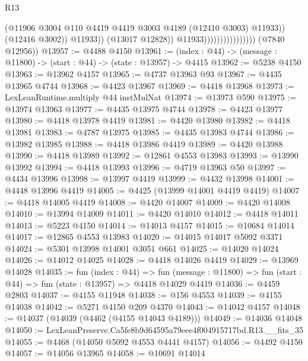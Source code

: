 \begin{lexlean}{R13}
\begin{coremodule}
                                                (@11906
                                                  @3004
                                                  @110
                                                  @4419
                                                  @4419
                                                  @3003
                                                  @4189
                                                  (@12410 @3003)
                                                  @11933))
                                              (@12416 @3002))
                                            @11933))
                                        (@13017 @12828))
                                      @11933))))))))))))))))
      (@7840 @12956))
@13957 := @4488 @4150
@13961 := (index : @44) -> (message : @11800) -> (start : @44) -> (state : @13957) -> @4415
@13962 := @5238 @4150
@13963 := @13962 @4157
@13965 := @4737 @13963 @93
@13967 := @4435 @13965 @4744
@13968 := @4423 @13967
@13969 := @4418 @13968
@13973 := LexLeanRuntime.multiply @44 instMulNat
@13974 := @13973 @590
@13975 := @13974 @13963
@13977 := @4435 @13975 @4744
@13978 := @4423 @13977
@13980 := @4418 @13978 @4419
@13981 := @4420 @13980
@13982 := @4418 @13981
@13983 := @4787 @13975
@13985 := @4435 @13983 @4744
@13986 := @13982 @13985
@13988 := @4418 @13986 @4419
@13989 := @4420 @13988
@13990 := @4418 @13989
@13992 := @12861 @4553 @13983
@13993 := @13990 @13992
@13994 := @4418 @13993
@13996 := @4719 @13963 @50
@13997 := @4434 @13996
@13998 := @13997 @4419
@13999 := @4432 @13998
@14001 := @4448 @13996 @4419
@14005 := @4425 (@13999 @14001 @4419 @4419)
@14007 := @4418 @14005 @4419
@14008 := @4420 @14007
@14009 := @4420 @14008
@14010 := @13994 @14009
@14011 := @4420 @14010
@14012 := @4418 @14011
@14013 := @5223 @4150
@14014 := @14013 @4157
@14015 := @10684 @14014
@14017 := @12865 @4553 @13983
@14020 := @14015 @14017 @5092 @3371
@14024 := @5301 @13998 @14001 @3051 @661
@14025 := @14020 @14024
@14026 := @14012 @14025
@14028 := @4418 @14026 @4419
@14029 := @13969 @14028
@14035 := fun (index : @44) =>
  fun (message : @11800) => fun (start : @44) => fun (state : @13957) => @4418 @14029 @4419
@14036 := @4459 @2803
@14037 := @4155 @11948
@14038 := @156 @4553
@14039 := @4155 @14038
@14042 := @5271 @4150 @209 @4370
@14043 := @14042 @4157
@14048 := @14037 (@14039 (@4462 (@4155 @14043 @4189)))
@14049 := @14036 @14048
@14050 := LexLeanPreserve.Ca5fe8b9d64595a79eee4f004915717bd.R13.__fits_35
@14055 := @4468 (@14050 @5092 @4553 @4441 @4157)
@14056 := @4492 @4150
@14057 := @14056 @13965
@14058 := @10691 @14014

\end{coremodule}
\end{lexlean}
